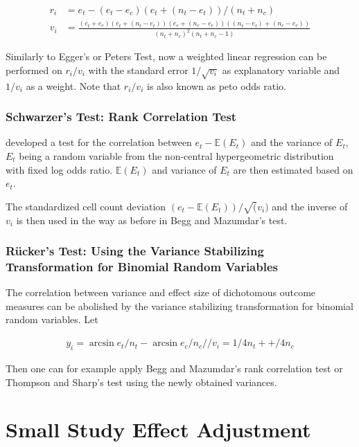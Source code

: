 \documentclass[11pt,a4paper,twoside]{book}\usepackage[]{graphicx}\usepackage[]{color}
\begin{document}
\begin{align}
r_{i} &= e_{t} - (e_{t} - e_{c})(e_{t} + (n_{t} - e_{t}))/(n_{t} + n_{c}) \label{harbord.score} \\
v_{i} &= \frac{(e_{t} + e_{c})(e_{t} + (n_{t} - e_{t}))(e_{c} + (n_{c} - e_{c}))((n_{t} - e_{t}) + (n_{c} - e_{c}))}{(n_{t} + n_{c})^2(n_{t} + n_{c} - 1)} \label{harbord.variance}
\end{align}

Similarly to Egger's or Peters Test, now a weighted linear regression can be performed on $r_{i}/v_{i}$ with the standard error $1/\sqrt{v_{i}}$ as explanatory variable and $1/v_{i}$ as a weight. Note that $r_{i}/v_{i}$ is also known as peto odds ratio. 

\subsubsection{Schwarzer's Test: Rank Correlation Test}
\citet{Schwarzer} developed a test for the correlation between $e_{t} - \mathbb{E}(E_{t})$ and the variance of $E_{t}$, $E_{t}$ being a random variable from the non-central hypergeometric distribution with fixed log odds ratio. $\mathbb{E}(E_{t})$ and variance of $E_{t}$ are then estimated based on $e_{t}$.

\vspace{0mm}
The standardized cell count deviation $(e_{t} - \mathbb{E}(E_{t}))/\sqrt(v_{i})$ and the inverse of $v_{i}$ is then used in the way as before in Begg and Mazumdar's test.

\subsubsection{R\"ucker's Test: Using the Variance Stabilizing Transformation for Binomial Random Variables}
The correlation between variance and effect size of dichotomous outcome measures can be abolished by the variance stabilizing transformation for binomial random variables. Let 

\begin{align}
y_{i} = \arcsin{e_{t}/n_{t}} - \arcsin{e_{c}/n_{c}}// 
v_{i} = 1/4n_{t} + +/4n_{c}
\end{align}

Then one can for example apply Begg and Mazumdar's rank correlation test or Thompson and Sharp's test using the newly obtained variances. 


\section{Small Study Effect Adjustment}
\end{document}
